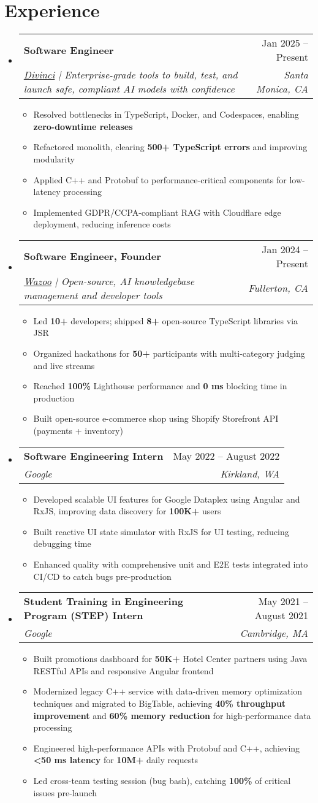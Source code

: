 \documentclass[letterpaper,11pt]{article}
\makeatletter
\newcommand{\resumeItem}[1]{
  \item\small{
    {#1 \vspace{-2pt}}
  }
}
\newcommand{\resumeSubheading}[4]{
  \vspace{-2pt}\item
    \begin{tabular*}{0.97\textwidth}[t]{l@{\extracolsep{\fill}}r}
      \textbf{#1} & #2 \\
      \textit{\small#3} & \textit{\small #4} \\
    \end{tabular*}\vspace{-2pt}
}
\newcommand{\resumeSubHeadingListStart}{\begin{itemize}[leftmargin=0.15in, label={}]}
\newcommand{\resumeSubHeadingListEnd}{\end{itemize}}
\newcommand{\resumeItemListStart}{\begin{itemize}}
\newcommand{\resumeItemListEnd}{\end{itemize}\vspace{-3pt}}
\makeatother
\begin{document}
\section{Experience}
\resumeSubHeadingListStart
  \resumeSubheading
    {Software Engineer}{Jan 2025 -- Present}
    {\href{https://divinci.ai/}{Divinci} | Enterprise-grade tools to build, test, and launch safe, compliant AI models with confidence}{Santa Monica, CA}
    \resumeItemListStart
      \resumeItem{Resolved bottlenecks in TypeScript, Docker, and Codespaces, enabling \textbf{zero-downtime releases}}
      \resumeItem{Refactored monolith, clearing \textbf{500+ TypeScript errors} and improving modularity}
      \resumeItem{Applied C++ and Protobuf to performance-critical components for low-latency processing}
      \resumeItem{Implemented GDPR/CCPA-compliant RAG with Cloudflare edge deployment, reducing inference costs}
    \resumeItemListEnd
  
  \resumeSubheading
    {Software Engineer, Founder}{Jan 2024 -- Present}
    {\href{https://wazoo.tech/}{Wazoo} | Open-source, AI knowledgebase management and developer tools}{Fullerton, CA}
    \resumeItemListStart
      \resumeItem{Led \textbf{10+} developers; shipped \textbf{8+} open-source TypeScript libraries via JSR}
      \resumeItem{Organized hackathons for \textbf{50+} participants with multi-category judging and live streams}
      \resumeItem{Reached \textbf{100\%} Lighthouse performance and \textbf{0 ms} blocking time in production}
      \resumeItem{Built open-source e-commerce shop using Shopify Storefront API (payments + inventory)}
    \resumeItemListEnd

  \resumeSubheading
    {Software Engineering Intern}{May 2022 -- August 2022}
    {Google}{Kirkland, WA}
    \resumeItemListStart
      \resumeItem{Developed scalable UI features for Google Dataplex using Angular and RxJS, improving data discovery for \textbf{100K+} users}
      \resumeItem{Built reactive UI state simulator with RxJS for UI testing, reducing debugging time}
      \resumeItem{Enhanced quality with comprehensive unit and E2E tests integrated into CI/CD to catch bugs pre-production}
    \resumeItemListEnd

  \resumeSubheading
    {Student Training in Engineering Program (STEP) Intern}{May 2021 -- August 2021}
    {Google}{Cambridge, MA}
    \resumeItemListStart
      \resumeItem{Built promotions dashboard for \textbf{50K+} Hotel Center partners using Java RESTful APIs and responsive Angular frontend}
      \resumeItem{Modernized legacy C++ service with data-driven memory optimization techniques and migrated to BigTable, achieving \textbf{40\% throughput improvement} and \textbf{60\% memory reduction} for high-performance data processing}
      \resumeItem{Engineered high-performance APIs with Protobuf and C++, achieving \textbf{<50 ms latency} for \textbf{10M+} daily requests}
      \resumeItem{Led cross-team testing session (bug bash), catching \textbf{100\%} of critical issues pre-launch}
    \resumeItemListEnd
\resumeSubHeadingListEnd
\end{document}
